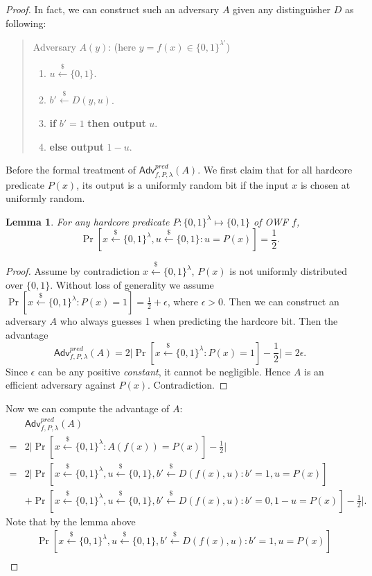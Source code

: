 \documentclass[12pt]{article}
\newcommand{\bits}{\{0,1\}}
\newcommand{\getsr}{\stackrel{\$}{\gets}}
\newcommand{\Adv}{\textsf{Adv}}
\newtheorem{lemma}[theorem]{Lemma}
\theoremstyle{definition}
\begin{document}
\begin{proof}
In fact, we can construct such an adversary $A$ given any distinguisher $D$ as following:
\begin{quote}
Adversary $A(y)$: (here $y=f(x)\in\bits^{\lambda'}$)
\begin{enumerate}
\item $u \getsr \bits$.
\item $b' \getsr D(y,u)$.
\item {\bf if} $b'=1$ {\bf then output} $u$.
\item {\bf else output} $1-u$.
\end{enumerate}
\end{quote}
Before the formal treatment of $\Adv_{f,P,\lambda}^{pred}(A)$. We first claim that for all hardcore predicate $P(x)$, its output is a uniformly random bit if the input $x$ is chosen at uniformly random.
\begin{lemma}
For any hardcore predicate $P : \bits^\lambda \mapsto \bits$ of OWF $f$,
$$\Pr[x\getsr\bits^\lambda, u\getsr\bits : u = P(x)] = \frac{1}{2}.$$
\end{lemma}
\begin{proof}
Assume by contradiction $x\getsr\bits^\lambda$, $P(x)$ is not uniformly distributed over $\bits$. Without loss of generality we assume $\Pr[x\getsr\bits^\lambda: P(x)=1] = \frac{1}{2}+\epsilon$, where $\epsilon>0$. Then we can construct an adversary $A$ who always guesses 1 when predicting the hardcore bit. Then the advantage
$$\Adv_{f,P,\lambda}^{pred}(A) = 2\bigg| \Pr[x\getsr\bits^\lambda: P(x)=1] -\frac{1}{2} \bigg| = 2\epsilon.$$
Since $\epsilon$ can be any positive \emph{constant}, it cannot be negligible. Hence $A$ is an efficient adversary against $P(x)$. Contradiction.
\end{proof}
Now we can compute the advantage of $A$:
$$
\begin{aligned}
&\Adv_{f,P,\lambda}^{pred}(A) \\
=& 2\bigg| \Pr[x\getsr\bits^\lambda: A(f(x)) = P(x)] - \frac{1}{2} \bigg| \\
=& 2\bigg| \Pr[x\getsr\bits^\lambda, u\getsr\bits, b'\getsr D(f(x),u): b'=1, u = P(x)]\\
&+ \Pr[x\getsr\bits^\lambda, u\getsr\bits, b'\getsr D(f(x),u): b'=0, 1-u = P(x)] - \frac{1}{2} \bigg|.
\end{aligned}
$$
Note that by the lemma above
$$\begin{aligned}
&\Pr[x\getsr\bits^\lambda, u\getsr\bits, b'\getsr D(f(x),u): b'=1, u = P(x)] \\

\end{aligned}$$
\end{proof}
\end{document}
